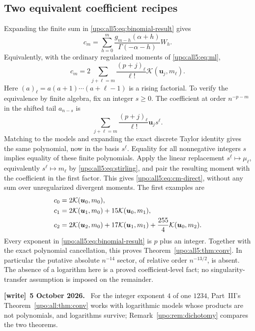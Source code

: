 \documentclass[11pt,letterpaper]{article}
\theoremstyle{remark}\newtheorem{remark}[theorem]{Remark}
\numberwithin{equation}{section}
\newcommand{\fall}[2]{#1^{\underline{#2}}}
\newcommand{\rise}[2]{(#1)_{#2}}
\newcommand{\bfU}{\boldsymbol u}
\newenvironment{writenote}[1][]{\par\smallskip\begingroup\small
 \noindent\textbf{[write]}\if\relax\detokenize{#1}\relax\else~\textbf{#1.}\fi\ }%
 {\par\endgroup\smallskip}
\begin{document}
\subsection{Two equivalent coefficient recipes}
Expanding the finite sum in \eqref{upo:all5:eq:binomial-result} gives
\begin{equation}\label{upo:all5:eq:cm-binomial}
 c_m=\sum_{h=0}^m
       \frac{g_{m-h}(\alpha+h)}{\Gamma(-\alpha-h)}W_h.
\end{equation}
Equivalently, with the ordinary regularized moments of
\eqref{upo:all5:eq:ml},
\begin{equation}\label{upo:all5:eq:cm-direct}
 c_m=2\sum_{j+\ell=m}
       \frac{\rise{p+j}\ell}{\ell!}\mathcal K(\bfU_j,m_\ell).
\end{equation}
Here $\rise a\ell=a(a+1)\cdots(a+\ell-1)$ is a rising factorial.
To verify the equivalence by finite algebra, fix an integer $s\ge0$.
The coefficient at order $n^{-p-m}$ in the shifted tail $a_{n-s}$ is
\[
 \sum_{j+\ell=m}\frac{\rise{p+j}\ell}{\ell!}\bfU_j s^\ell.
\]
Matching to the models and expanding the exact discrete Taylor
identity gives the same polynomial, now in the basis $\fall s\ell$.
Equality for all nonnegative integers $s$ implies equality of these
finite polynomials. Apply the linear replacement
$\fall s\ell\mapsto\mu_\ell$, equivalently
$s^\ell\mapsto m_\ell$ by \eqref{upo:all5:eq:stirling}, and pair the resulting
moment with the coefficient in the first factor. This gives
\eqref{upo:all5:eq:cm-direct}, without any sum over unregularized divergent
moments. The first examples are
\begin{align}\label{upo:all5:eq:cm-small}
 c_0&=2\mathcal K(\bfU_0,m_0),\notag\\
 c_1&=2\mathcal K(\bfU_1,m_0)+15\mathcal K(\bfU_0,m_1),\\
 c_2&=2\mathcal K(\bfU_2,m_0)+17\mathcal K(\bfU_1,m_1)
                          +\frac{255}{4}\mathcal K(\bfU_0,m_2).\notag
\end{align}
Every exponent in \eqref{upo:all5:eq:binomial-result} is $p$ plus an integer.
Together with the exact polynomial cancellation, this proves
Theorem~\ref{upo:all5:thm:conv}. In particular the putative absolute
$n^{-14}$ sector, of relative order $n^{-13/2}$, is absent.
The absence of a logarithm here is a proved coefficient-level fact;
no singularity-transfer assumption is imposed on the remainder.
\begin{writenote}[5 October 2026]
For the integer exponent $4$ of one $1234$, Part~III's Theorem~\ref{upo:all:thm:conv} works with logarithmic models whose products are not polynomials, and logarithms survive; Remark~\ref{upo:rem:dichotomy} compares the two theorems.
\end{writenote}
\end{document}
